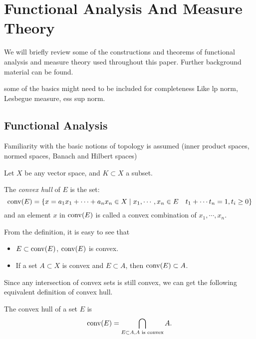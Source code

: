 \chapter{Functional Analysis And Measure Theory}
\label{app:function_measure}


We will briefly review some of the constructions and theorems of functional
analysis and measure theory used throughout this paper. Further background
material can be found.

\TODO some of the basics might need to be included for completeness
Like lp norm, Lesbegue measure, ess sup norm.

\section{Functional Analysis}

Familiarity with the basic notions of topology is assumed (inner product
spaces, normed spaces, Banach and Hilbert spaces)



Let $X$ be any vector space, and $K \subset X$ a subset.

\begin{definition}
   \label{def:convex_hull}
   The \textit{convex hull} of $E$ is the set:
   \begin{equation}
      \operatorname*{conv}(E) 
      = \{x = a_1x_1 + \cdots + a_nx_n \in X \mid 
      x_1, \cdots, x_n \in E \quad
      t_1 + \cdots t_n = 1, t_i \geq 0\}
   \end{equation}
   and an element $x$ in $\operatorname*{conv}(E)$ is called a convex combination of $x_1,
   \cdots, x_n$.
\end{definition}

From the definition, it is easy to see that 
\begin{itemize}
   \item $E \subset \operatorname*{conv}(E)$, $\operatorname*{conv}(E)$ is convex.
   \item If a set $A \subset X$ is convex and $E \subset A$, then $\operatorname*{conv}(E) \subset A$.
\end{itemize}

Since any intersection of convex sets is still convex, we can get the following
equivalent definition of convex hull.

\begin{proposition}
   The convex hull of a set $E$ is 
   \begin{equation}
      \operatorname*{conv}(E) = \bigcap_{E \subset A, A \text{ is convex}} A.
   \end{equation}   
\end{proposition}

